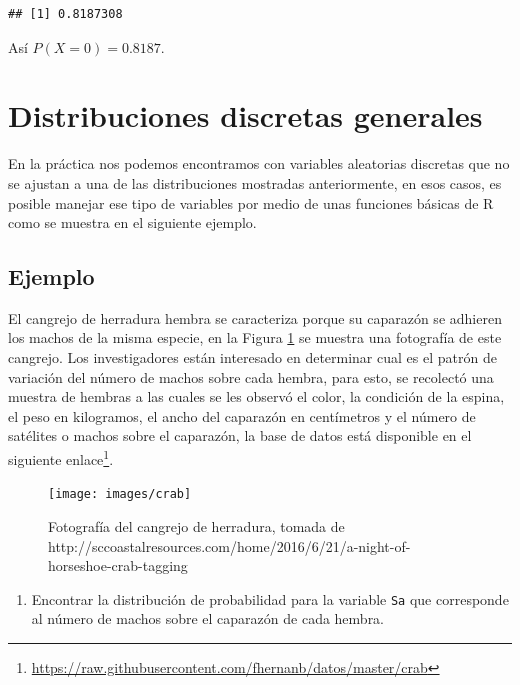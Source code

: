 \documentclass[
]{book}
\providecommand{\tightlist}{%
  \setlength{\itemsep}{0pt}\setlength{\parskip}{0pt}}
\renewcommand{\href}[2]{#2\footnote{\url{#1}}}
\begin{document}
\begin{verbatim}
## [1] 0.8187308
\end{verbatim}

Así \(P(X=0)=0.8187\).

\hypertarget{distribuciones-discretas-generales}{%
\section{Distribuciones discretas generales}\label{distribuciones-discretas-generales}}

En la práctica nos podemos encontramos con variables aleatorias discretas que no se ajustan a una de las distribuciones mostradas anteriormente, en esos casos, es posible manejar ese tipo de variables por medio de unas funciones básicas de R como se muestra en el siguiente ejemplo.

\hypertarget{ejemplo-47}{%
\subsection*{Ejemplo}\label{ejemplo-47}}

El cangrejo de herradura hembra se caracteriza porque su caparazón se adhieren los machos de la misma especie, en la Figura \ref{fig:crab} se muestra una fotografía de este cangrejo. Los investigadores están interesado en determinar cual es el patrón de variación del número de machos sobre cada hembra, para esto, se recolectó una muestra de hembras a las cuales se les observó el color, la condición de la espina, el peso en kilogramos, el ancho del caparazón en centímetros y el número de satélites o machos sobre el caparazón, la base de datos está disponible en el siguiente \href{https://raw.githubusercontent.com/fhernanb/datos/master/crab}{enlace}. \label{crabs}

\begin{figure}

{\centering \texttt{[image: images/crab]} 

}

\caption{Fotografía del cangrejo de herradura, tomada de http://sccoastalresources.com/home/2016/6/21/a-night-of-horseshoe-crab-tagging}\label{fig:crab}
\end{figure}

\begin{enumerate}
\def\labelenumi{\arabic{enumi})}
\tightlist
\item
  Encontrar la distribución de probabilidad para la variable \texttt{Sa} que corresponde al número de machos sobre el caparazón de cada hembra.
\end{enumerate}
\end{document}
